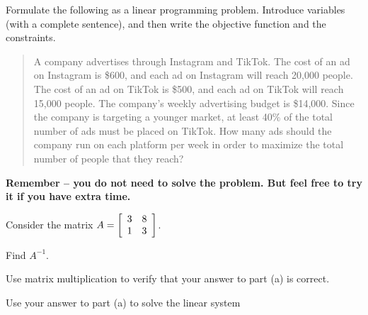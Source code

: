 \documentclass[11pt]{exam}
\begin{document}
\addpoints

\noindent
\begin{center}
\gradetable[v][pages]  %
\end{center}


\newpage %

%
%
%

\begin{questions}
\question[5] Formulate the following as a linear programming problem. Introduce variables (with a complete sentence), and then write the objective function and the constraints.

\begin{quote}
A company advertises through Instagram and TikTok.  The cost of an ad on Instagram is \$600, and each ad on Instagram will reach 20,000 people.  The cost of an ad on TikTok is \$500, and each ad on TikTok will reach 15,000 people.
The company's weekly advertising budget is \$14,000. Since the company is targeting a younger market, at least 40\% of the total number of ads must be placed on TikTok.  How many ads should the company run on each platform per week in order to maximize the total number of people that they reach?
\end{quote}

\textbf{Remember -- you do not need to solve the problem.  But feel free to try it if you have extra time.}
\newpage

\question[6] Consider the matrix $A=\MATRIX{rr}{3 & 8\\1 & 3}$.
\begin{compactenum}[(a)]
\item Find $A^{-1}$.
\vspace{6cm}

\item Use matrix multiplication to verify that your answer to part (a) is correct.
\vspace{4cm}

\item Use your answer to part (a) to solve the linear system
\begin{center}
\end{center}


\end{compactenum}
\end{questions}
\end{document}
